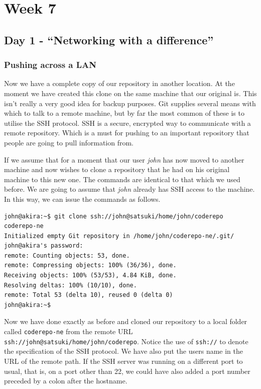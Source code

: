 \cleardoublepage
\chapter{Week 7}

\section{Day 1 - ``Networking with a difference''}
\subsection{Pushing across a LAN}

Now we have a complete copy of our repository in another location.
At the moment we have created this clone on the same machine that our original is.
This isn't really a very good idea for backup purposes.
Git supplies several means with which to talk to a remote machine, but by far the most common of these is to utilise the SSH protocol.
SSH is a secure, encrypted way to communicate with a remote repository.
Which is a must for pushing to an important repository that people are going to pull information from.

If we assume that for a moment that our user \emph{john} has now moved to another machine and now wishes to clone a repository that he had on his original machine to this new one.
The commands are identical to that which we used before.
We are going to assume that \emph{john} already has SSH access to the machine.
In this way, we can issue the commands as follows.

\begin{Verbatim}
john@akira:~$ git clone ssh://john@satsuki/home/john/coderepo coderepo-ne
Initialized empty Git repository in /home/john/coderepo-ne/.git/
john@akira's password:
remote: Counting objects: 53, done.
remote: Compressing objects: 100% (36/36), done.
Receiving objects: 100% (53/53), 4.84 KiB, done.
Resolving deltas: 100% (10/10), done.
remote: Total 53 (delta 10), reused 0 (delta 0)
john@akira:~$
\end{Verbatim}

Now we have done exactly as before and cloned our repository to a local folder called \texttt{coderepo-ne} from the remote URL \texttt{ssh://john@satsuki/home/john/coderepo}.
Notice the use of \texttt{ssh://} to denote the specification of the SSH protocol.
We have also put the users name in the URL of the remote path.
If the SSH server was running on a different port to usual, that is, on a port other than 22, we could have also added a port number preceded by a colon after the hostname.

